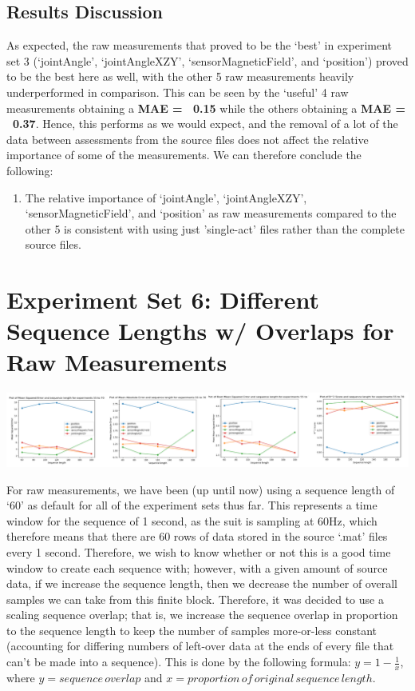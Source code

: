 \documentclass[12pt,twoside]{report}
\begin{document}
\subsection{Results Discussion}

\quad As expected, the raw measurements that proved to be the ‘best’ in experiment set 3 (‘jointAngle’, ‘jointAngleXZY’, ‘sensorMagneticField’, and ‘position’) proved to be the best here as well, with the other 5 raw measurements heavily underperformed in comparison. This can be seen by the ‘useful’ 4 raw measurements obtaining a \textbf{MAE = ~0.15} while the others obtaining a \textbf{MAE = ~0.37}. Hence, this performs as we would expect, and the removal of a lot of the data between assessments from the source files does not affect the relative importance of some of the measurements. We can therefore conclude the following:

\begin{enumerate}
	\item The relative importance of ‘jointAngle’, ‘jointAngleXZY’, ‘sensorMagneticField’, and ‘position’ as raw measurements compared to the other 5 is consistent with using just 'single-act' files rather than the complete source files.
\end{enumerate}





\section{Experiment Set 6: Different Sequence Lengths w/ Overlaps for Raw Measurements}

\begin{center}
\includegraphics[scale=0.4]{project_figures/fig10_13}
\end{center}

\quad For raw measurements, we have been (up until now) using a sequence length of ‘60’ as default for all of the experiment sets thus far. This represents a time window for the sequence of 1 second, as the suit is sampling at 60Hz, which therefore means that there are 60 rows of data stored in the source ‘.mat’ files every 1 second. Therefore, we wish to know whether or not this is a good time window to create each sequence with; however, with a given amount of source data, if we increase the sequence length, then we decrease the number of overall samples we can take from this finite block. Therefore, it was decided to use a scaling sequence overlap; that is, we increase the sequence overlap in proportion to the sequence length to keep the number of samples more-or-less constant (accounting for differing numbers of left-over data at the ends of every file that can’t be made into a sequence). This is done by the following formula: $y=1-\frac{1}{x}$, where $y=sequence\, overlap$ and $x=proportion\, of\, original\, sequence\, length$.\\
\end{document}
